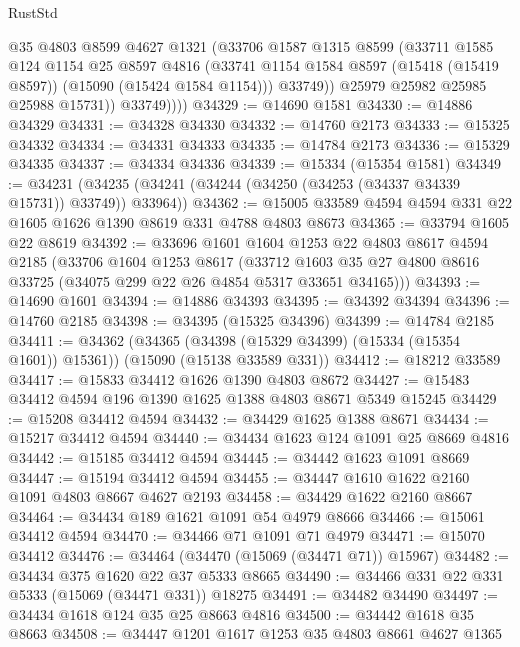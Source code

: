\begin{lexlean}{RustStd}
\begin{coremodule}
                @35
                @4803
                @8599
                @4627
                @1321
                (@33706
                  @1587
                  @1315
                  @8599
                  (@33711
                    @1585
                    @124
                    @1154
                    @25
                    @8597
                    @4816
                    (@33741 @1154 @1584 @8597 (@15418 (@15419 @8597)) (@15090 (@15424 @1584 @1154)))
                    @33749))
                @25979
                @25982
                @25985
                @25988
                @15731))
            @33749))))
@34329 := @14690 @1581
@34330 := @14886 @34329
@34331 := @34328 @34330
@34332 := @14760 @2173
@34333 := @15325 @34332
@34334 := @34331 @34333
@34335 := @14784 @2173
@34336 := @15329 @34335
@34337 := @34334 @34336
@34339 := @15334 (@15354 @1581)
@34349 := @34231 (@34235 (@34241 (@34244 (@34250 (@34253 (@34337 @34339 @15731)) @33749)) @33964))
@34362 := @15005 @33589 @4594 @4594 @331 @22 @1605 @1626 @1390 @8619 @331 @4788 @4803 @8673
@34365 := @33794 @1605 @22 @8619
@34392 := @33696
    @1601
    @1604
    @1253
    @22
    @4803
    @8617
    @4594
    @2185
    (@33706
      @1604
      @1253
      @8617
      (@33712 @1603 @35 @27 @4800 @8616 @33725 (@34075 @299 @22 @26 @4854 @5317 @33651 @34165)))
@34393 := @14690 @1601
@34394 := @14886 @34393
@34395 := @34392 @34394
@34396 := @14760 @2185
@34398 := @34395 (@15325 @34396)
@34399 := @14784 @2185
@34411 := @34362
    (@34365 (@34398 (@15329 @34399) (@15334 (@15354 @1601)) @15361))
    (@15090 (@15138 @33589 @331))
@34412 := @18212 @33589
@34417 := @15833 @34412 @1626 @1390 @4803 @8672
@34427 := @15483 @34412 @4594 @196 @1390 @1625 @1388 @4803 @8671 @5349 @15245
@34429 := @15208 @34412 @4594
@34432 := @34429 @1625 @1388 @8671
@34434 := @15217 @34412 @4594
@34440 := @34434 @1623 @124 @1091 @25 @8669 @4816
@34442 := @15185 @34412 @4594
@34445 := @34442 @1623 @1091 @8669
@34447 := @15194 @34412 @4594
@34455 := @34447 @1610 @1622 @2160 @1091 @4803 @8667 @4627 @2193
@34458 := @34429 @1622 @2160 @8667
@34464 := @34434 @189 @1621 @1091 @54 @4979 @8666
@34466 := @15061 @34412 @4594
@34470 := @34466 @71 @1091 @71 @4979
@34471 := @15070 @34412
@34476 := @34464 (@34470 (@15069 (@34471 @71)) @15967)
@34482 := @34434 @375 @1620 @22 @37 @5333 @8665
@34490 := @34466 @331 @22 @331 @5333 (@15069 (@34471 @331)) @18275
@34491 := @34482 @34490
@34497 := @34434 @1618 @124 @35 @25 @8663 @4816
@34500 := @34442 @1618 @35 @8663
@34508 := @34447 @1201 @1617 @1253 @35 @4803 @8661 @4627 @1365

\end{coremodule}
\end{lexlean}
